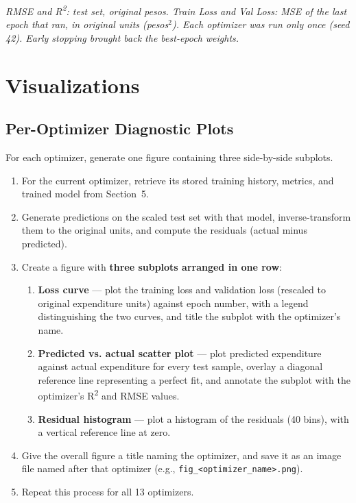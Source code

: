 \documentclass[12pt,a4paper]{article}
\begin{document}
\begin{center}\small\textit{RMSE and R\textsuperscript{2}: test set, original pesos. Train Loss and Val Loss: MSE of the last epoch that ran, in original units (pesos$^2$). Each optimizer was run only once (seed 42). Early stopping brought back the best-epoch weights.}\end{center}

\section{Visualizations}

\subsection{Per-Optimizer Diagnostic Plots}

For each optimizer, generate one figure containing three side-by-side subplots.

\begin{stepbox}
\begin{enumerate}[leftmargin=*, label=\arabic*.]
  \item For the current optimizer, retrieve its stored training history, metrics, and
        trained model from Section~5.
  \item Generate predictions on the scaled test set with that model, inverse-transform
        them to the original units, and compute the residuals (actual minus predicted).
  \item Create a figure with \textbf{three subplots arranged in one row}:
  \begin{enumerate}[leftmargin=*, label=(\alph*)]
    \item \textbf{Loss curve} — plot the training loss and validation loss (rescaled
          to original expenditure units) against epoch number, with a legend
          distinguishing the two curves, and title the subplot with the optimizer's name.
    \item \textbf{Predicted vs. actual scatter plot} — plot predicted expenditure
          against actual expenditure for every test sample, overlay a diagonal
          reference line representing a perfect fit, and annotate the subplot with
          the optimizer's R\textsuperscript{2} and RMSE values.
    \item \textbf{Residual histogram} — plot a histogram of the residuals (40 bins),
          with a vertical reference line at zero.
  \end{enumerate}
  \item Give the overall figure a title naming the optimizer, and save it as an image
        file named after that optimizer (e.g., \texttt{fig\_<optimizer\_name>.png}).
  \item Repeat this process for all 13 optimizers.
\end{enumerate}
\end{stepbox}
\end{document}

